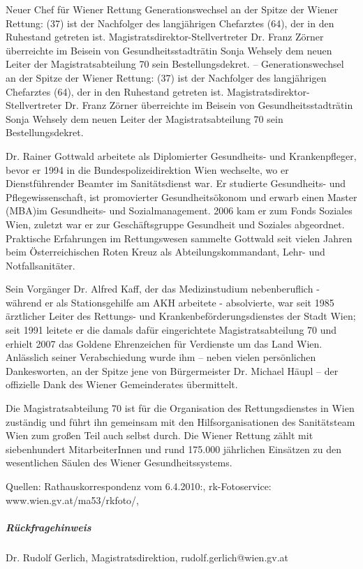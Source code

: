 \begin{NewsItem}{}{Neuer Chef für Wiener Rettung}
{}
{Generationswechsel an der Spitze der Wiener Rettung: 
(37) ist der Nachfolger des langjährigen Chefarztes  (64), der
in den Ruhestand getreten ist. Magistratsdirektor-Stellvertreter Dr. Franz Zörner
überreichte im Beisein von Gesundheitsstadträtin Sonja Wehsely dem neuen Leiter
der Magistratsabteilung 70 sein Bestellungsdekret. 
} {}
 -- 
Generationswechsel an der Spitze der Wiener Rettung:  (37)
ist der Nachfolger des langjährigen Chefarztes  (64), der in
den Ruhestand getreten ist. Magistratsdirektor-Stellvertreter Dr. Franz Zörner
überreichte im Beisein von Gesundheitsstadträtin Sonja Wehsely dem neuen Leiter
der Magistratsabteilung 70 sein Bestellungsdekret.

Dr. Rainer Gottwald arbeitete als Diplomierter Gesundheits- und Krankenpfleger,
bevor er 1994 in die Bundespolizeidirektion Wien wechselte, wo er Dienstführender
Beamter im Sanitätsdienst war. Er studierte Gesundheits- und Pflegewissenschaft,
ist promovierter Gesundheitsökonom und erwarb einen Master (MBA)im Gesundheits-
und Sozialmanagement. 2006 kam er zum Fonds Soziales Wien, zuletzt war er zur
Geschäftsgruppe Gesundheit und Soziales abgeordnet. Praktische Erfahrungen im
Rettungswesen sammelte Gottwald seit vielen Jahren beim Österreichischen Roten
Kreuz als Abteilungskommandant, Lehr- und Notfallsanitäter.

Sein Vorgänger Dr. Alfred Kaff, der das Medizinstudium nebenberuflich - während
er als Stationsgehilfe am AKH arbeitete - absolvierte, war seit 1985 ärztlicher
Leiter des Rettungs- und Krankenbeförderungsdienstes der Stadt Wien; seit 1991
leitete er die damals dafür eingerichtete Magistratsabteilung 70 und erhielt 2007
das Goldene Ehrenzeichen für Verdienste um das Land Wien. Anlässlich seiner
Verabschiedung wurde ihm -- neben vielen persönlichen Dankesworten, an der Spitze
jene von Bürgermeister Dr. Michael Häupl -- der offizielle Dank des Wiener
Gemeinderates übermittelt.

Die Magistratsabteilung 70 ist für die Organisation des Rettungsdienstes in Wien
zuständig und führt ihn gemeinsam mit den Hilfsorganisationen des Sanitätsteam
Wien zum großen Teil auch selbst durch. Die Wiener Rettung zählt mit
siebenhundert MitarbeiterInnen und rund 175.000 jährlichen Einsätzen zu den
wesentlichen Säulen des Wiener Gesundheitssystems.

{\scriptsize Quellen: Rathauskorrespondenz vom 6.4.2010:, rk-Fotoservice:
www.wien.gv.at/ma53/rkfoto/, \AASS}

\subparagraph{Rückfragehinweis}
\scriptsize
\begin{compactdesc}
  \item[Stadt Wien] Dr. Rudolf Gerlich, Magistratsdirektion, rudolf.gerlich@wien.gv.at
\end{compactdesc}
\end{NewsItem}


